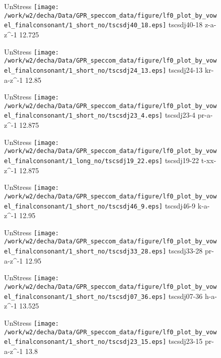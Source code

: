 \documentclass{article}
\begin{document}
\begin{figure}[t]
\begin{minipage}[b]{.24\textwidth}
UnStress
\centering
\texttt{[image: /work/w2/decha/Data/GPR\_speccom\_data/figure/lf0\_plot\_by\_vowel\_finalconsonant/1\_short\_no/tscsdj40\_18.eps]}
tscsdj40-18 z-a-z\textasciicircum-1 12.725
\end{minipage}
\begin{minipage}[b]{.24\textwidth}
UnStress
\centering
\texttt{[image: /work/w2/decha/Data/GPR\_speccom\_data/figure/lf0\_plot\_by\_vowel\_finalconsonant/1\_short\_no/tscsdj24\_13.eps]}
tscsdj24-13 kr-a-z\textasciicircum-1 12.85
\end{minipage}
\begin{minipage}[b]{.24\textwidth}
UnStress
\centering
\texttt{[image: /work/w2/decha/Data/GPR\_speccom\_data/figure/lf0\_plot\_by\_vowel\_finalconsonant/1\_short\_no/tscsdj23\_4.eps]}
tscsdj23-4 pr-a-z\textasciicircum-1 12.875
\end{minipage}
\begin{minipage}[b]{.24\textwidth}
UnStress
\centering
\texttt{[image: /work/w2/decha/Data/GPR\_speccom\_data/figure/lf0\_plot\_by\_vowel\_finalconsonant/1\_long\_no/tscsdj19\_22.eps]}
tscsdj19-22 t-xx-z\textasciicircum-1 12.875
\end{minipage}
\end{figure}

\begin{figure}[t]
\begin{minipage}[b]{.24\textwidth}
UnStress
\centering
\texttt{[image: /work/w2/decha/Data/GPR\_speccom\_data/figure/lf0\_plot\_by\_vowel\_finalconsonant/1\_short\_no/tscsdj46\_9.eps]}
tscsdj46-9 k-a-z\textasciicircum-1 12.95
\end{minipage}
\begin{minipage}[b]{.24\textwidth}
UnStress
\centering
\texttt{[image: /work/w2/decha/Data/GPR\_speccom\_data/figure/lf0\_plot\_by\_vowel\_finalconsonant/1\_short\_no/tscsdj33\_28.eps]}
tscsdj33-28 pr-a-z\textasciicircum-1 12.95
\end{minipage}
\begin{minipage}[b]{.24\textwidth}
UnStress
\centering
\texttt{[image: /work/w2/decha/Data/GPR\_speccom\_data/figure/lf0\_plot\_by\_vowel\_finalconsonant/1\_short\_no/tscsdj07\_36.eps]}
tscsdj07-36 h-a-z\textasciicircum-1 13.525
\end{minipage}
\begin{minipage}[b]{.24\textwidth}
UnStress
\centering
\texttt{[image: /work/w2/decha/Data/GPR\_speccom\_data/figure/lf0\_plot\_by\_vowel\_finalconsonant/1\_short\_no/tscsdj23\_15.eps]}
tscsdj23-15 pr-a-z\textasciicircum-1 13.8
\end{minipage}
\end{figure}
\end{document}
